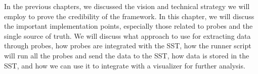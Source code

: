 In the previous chapters, we discussed the vision and technical strategy we will employ to prove the credibility of the framework. In this chapter, we will discuss the important implementation points, especially those related to probes and the single source of truth. We will discuss what approach to use for extracting data through probes, how probes are integrated with the SST, how the runner script will run all the probes and send the data to the SST, how data is stored in the SST, and how we can use it to integrate with a visualizer for further analysis.